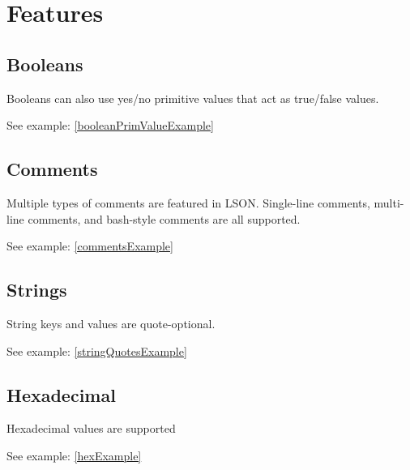 \documentclass[12pt]{article}
\begin{document}
\section{Features}
\subsection{Booleans}
Booleans can also use yes/no primitive values that act as true/false values.

See example: \ref{booleanPrimValueExample}

\subsection{Comments}
Multiple types of comments are featured in LSON. Single-line comments, multi-line comments, and bash-style comments are all supported.

See example: \ref{commentsExample}

\subsection{Strings}
String keys and values are quote-optional.

See example: \ref{stringQuotesExample}

\subsection{Hexadecimal}
Hexadecimal values are supported

See example: \ref{hexExample}
\end{document}
